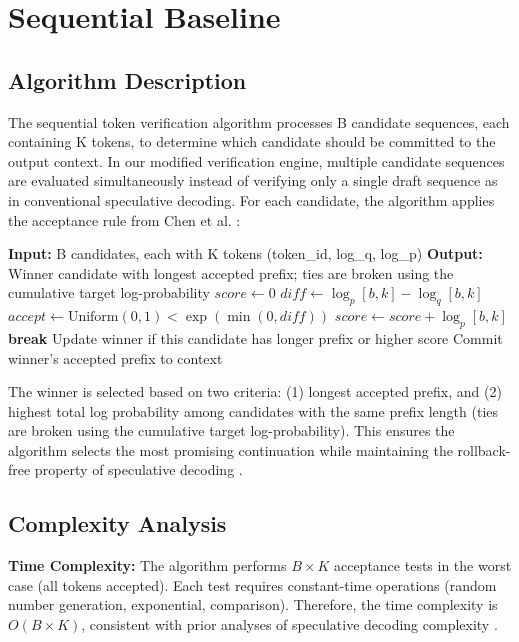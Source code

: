 \documentclass[conference]{IEEEtran}
\begin{document}
\section{Sequential Baseline}
\label{sec:sequential}

\subsection{Algorithm Description}

The sequential token verification algorithm processes B candidate sequences, each containing K tokens, to determine which candidate should be committed to the output context. In our modified verification engine, multiple candidate sequences are evaluated simultaneously instead of verifying only a single draft sequence as in conventional speculative decoding. For each candidate, the algorithm applies the acceptance rule from Chen et al. \cite{chen2023}:

\begin{algorithmic}
\STATE \textbf{Input:} B candidates, each with K tokens (token\_id, log\_q, log\_p)
\STATE \textbf{Output:} Winner candidate with longest accepted prefix; ties are broken using the cumulative target log-probability
    \STATE $score \leftarrow 0$
        \STATE $diff \leftarrow \log_p[b,k] - \log_q[b,k]$
        \STATE $accept \leftarrow \text{Uniform}(0,1) < \exp(\min(0, diff))$
            \STATE $score \leftarrow score + \log_p[b,k]$
        \ELSE
            \STATE \textbf{break} 
        \ENDIF
    \ENDFOR
    \STATE Update winner if this candidate has longer prefix or higher score
\ENDFOR
\STATE Commit winner's accepted prefix to context
\end{algorithmic}

The winner is selected based on two criteria: (1) longest accepted prefix, and (2) highest total log probability among candidates with the same prefix length (ties are broken using the cumulative target log-probability). This ensures the algorithm selects the most promising continuation while maintaining the rollback-free property of speculative decoding \cite{leviathan2023}.

\subsection{Complexity Analysis}

\textbf{Time Complexity:} The algorithm performs $B \times K$ acceptance tests in the worst case (all tokens accepted). Each test requires constant-time operations (random number generation, exponential, comparison). Therefore, the time complexity is $O(B \times K)$, consistent with prior analyses of speculative decoding complexity \cite{kaplan2020,hoffmann2022}.
\end{document}
